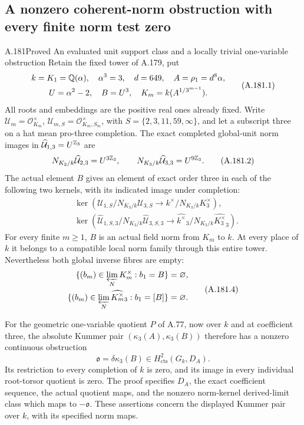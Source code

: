 \subsection{A nonzero coherent-norm obstruction with every finite norm test zero}

\begin{statement}{A.181}{Proved}
{An evaluated unit support class and a locally trivial one-variable obstruction}
Retain the fixed tower of A.179, put
\[
 \begin{gathered}
 k=K_1=\mathbb Q(\alpha),\quad \alpha^3=3,\quad
 d=649,\quad A=\rho_1=d^8\alpha,\\
 U=\alpha^2-2,\quad B=U^3,
 \quad K_m=k(A^{1/3^{m-1}}).
 \end{gathered}
\tag{A.181.1}
\]
All roots and embeddings are the positive real ones already fixed.
Write \(\mathcal U_m=\mathcal O_{K_m}^{\times}\),
\(\mathcal U_{m,S}=\mathcal O_{K_m,S_m}^{\times}\), with
\(S=\{2,3,11,59,\infty\}\), and let a subscript three on a
hat mean pro-three completion.  The exact completed global-unit norm
images in \(\widehat{\mathcal U}_{1,3}=U^{\mathbb Z_3}\) are
\[
 N_{K_2/k}\widehat{\mathcal U}_{2,3}=U^{3\mathbb Z_3},\qquad
 N_{K_3/k}\widehat{\mathcal U}_{3,3}=U^{9\mathbb Z_3}.
\tag{A.181.2}
\]
The actual element \(B\) gives an element of exact order three in
each of the following two kernels, with its indicated image under
completion:
\[
\begin{aligned}
 &\ker\left(\mathcal U_{1,S}/N_{K_3/k}\mathcal U_{3,S}
       \longrightarrow k^\times/N_{K_3/k}K_3^\times\right),\\
 &\ker\left(\widehat{\mathcal U}_{1,S,3}/
                    N_{K_3/k}\widehat{\mathcal U}_{3,S,3}
       \longrightarrow \widehat{k^\times}_3/
                    N_{K_3/k}\widehat{K_3^\times}_3\right).
\end{aligned}
\tag{A.181.3}
\]
For every finite \(m\ge1\), \(B\) is an actual field norm from
\(K_m\) to \(k\).  At every place of \(k\) it belongs to a
compatible local norm family through this entire tower.  Nevertheless
both global inverse fibres are empty:
\[
\begin{aligned}
 \{(b_m)\in\varprojlim_N K_m^\times:b_1=B\}&=\varnothing,\\
 \{(b_m)\in\varprojlim_N\widehat{K_m^\times}_3:b_1=[B]\}
       &=\varnothing.
\end{aligned}
\tag{A.181.4}
\]

For the geometric one-variable quotient \(P\) of A.77, now over
\(k\) and at coefficient three, the absolute Kummer pair
\((\kappa_3(A),\kappa_3(B))\) therefore has a nonzero continuous
obstruction
\[
 \mathfrak o=\delta\kappa_3(B)
      \in H^2_{\mathrm{cts}}(G_k,D_A).
\tag{A.181.5}
\]
Its restriction to every completion of \(k\) is zero, and its
image in every individual root-torsor quotient is zero.  The proof
specifies \(D_A\), the exact coefficient sequence, the actual
quotient maps, and the nonzero norm-kernel derived-limit class which
maps to \(-\mathfrak o\).  These assertions concern the displayed
Kummer pair over \(k\), with its specified norm maps.
\end{statement}

